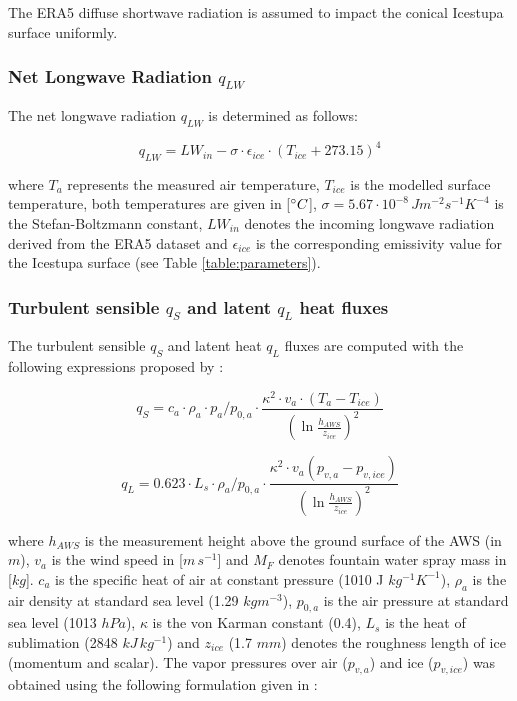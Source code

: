 \documentclass[utf8]{frontiersSCNS} %
\begin{document}
The ERA5 diffuse shortwave radiation is assumed to impact the conical Icestupa surface uniformly. 

\subsubsection{Net Longwave Radiation \texorpdfstring{$q_{LW}$}{Lg}}

The net longwave radiation $q_{LW}$ is determined as follows:

\begin{equation} q_{LW}= LW_{in}-\sigma \cdot \epsilon_{ice} \cdot {(T_{ice}+ 273.15)}^4
\label{eqn:LW} \end{equation}

where $T_a$ represents the measured air temperature, $T_{ice}$ is the modelled surface temperature, both temperatures
are given in [$\degree C$], $\sigma=5.67\cdot 10^{-8}\,Jm^{-2}s^{-1}K^{-4}$ is the Stefan-Boltzmann constant, $LW_{in}$
denotes the incoming longwave radiation derived from the ERA5 dataset and $\epsilon_{ice}$ is the corresponding
emissivity value for the Icestupa surface (see Table \ref{table:parameters}).

\subsubsection{Turbulent sensible \texorpdfstring{$q_{S}$}{Lg} and latent \texorpdfstring{$q_{L}$}{Lg} heat fluxes }

The turbulent sensible $q_{S}$ and latent heat $q_{L}$ fluxes are computed with the following expressions proposed by
\cite{Garratt_1992}:

\begin{equation} q_{S}=c_{a} \cdot \rho_{a} \cdot p_{a}/p_{0,a} \cdot \frac{\kappa^2 \cdot v_a \cdot
(T_a-T_{ice})}{{(\ln{\frac{h_{AWS}}{z_{ice}}})}^2} \label{eqn:qs} \end{equation}

\begin{equation} q_{L}=0.623 \cdot L_s \cdot \rho_{a}/p_{0,a} \cdot \frac{\kappa^2 \cdot
v_a(p_{v,a}-p_{v,ice})}{{(\ln{\frac{h_{AWS}}{z_{ice}}})}^2} \end{equation}

where $h_{AWS}$ is the measurement height above the ground surface of the AWS (in $m$), $v_a$ is the wind speed in
[$m\,s^{-1}$] and $M_{F}$ denotes fountain water spray mass in [$kg$]. $c_a$ is the specific heat of air at constant
pressure (1010 J $kg^{-1} K^{-1}$), $\rho_{a}$ is the air density at standard sea level (1.29 $kg m^{-3}$), $p_{0,a}$ is
the air pressure at standard sea level (1013 $hPa$), $\kappa$ is the von Karman constant (0.4), $L_s$ is the heat of
sublimation (2848 $kJ\, kg^{-1}$) and $z_{ice}$ (1.7 $mm$) denotes the roughness length of ice (momentum and scalar).
The vapor pressures over air ($p_{v,a}$) and ice ($p_{v,ice}$) was obtained using the following formulation given in
\cite{WMO_2018}:
\end{document}
